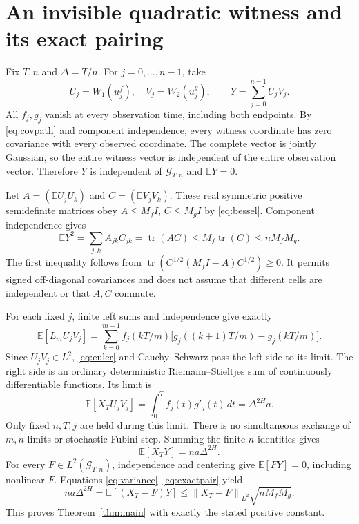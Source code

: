 \documentclass[11pt]{article}
\newcommand{\E}{\mathbb E}
\newcommand{\G}{\mathcal G}
\newcommand{\norm}[1]{\left\lVert#1\right\rVert}
\begin{document}
\section{An invisible quadratic witness and its exact pairing}
Fix $T,n$ and $\Delta=T/n$. For $j=0,\ldots,n-1$, take
\[
U_j=W_1(u_j^f),\quad V_j=W_2(u_j^g),\qquad
Y=\sum_{j=0}^{n-1}U_jV_j.
\]
All $f_j,g_j$ vanish at every observation time, including both endpoints. By \eqref{eq:covpath} and component independence, every witness coordinate has zero covariance with every observed coordinate. The complete vector is jointly Gaussian, so the entire witness vector is independent of the entire observation vector. Therefore $Y$ is independent of $\G_{T,n}$ and $\E Y=0$.

Let $A=(\E U_jU_k)$ and $C=(\E V_jV_k)$. These real symmetric positive semidefinite matrices obey $A\le M_fI$, $C\le M_gI$ by \eqref{eq:bessel}. Component independence gives
\begin{equation}
\E Y^2=\sum_{j,k}A_{jk}C_{jk}=\operatorname{tr}(AC)
\le M_f\operatorname{tr}(C)\le nM_fM_g.\label{eq:variance}
\end{equation}
The first inequality follows from
$\operatorname{tr}(C^{1/2}(M_fI-A)C^{1/2})\ge0$.
It permits signed off-diagonal covariances and does not assume that different cells are independent or that $A,C$ commute.

For each fixed $j$, finite left sums and independence give exactly
\begin{equation}
\E[L_mU_jV_j]=\sum_{k=0}^{m-1}f_j(kT/m)
\bigl[g_j((k+1)T/m)-g_j(kT/m)\bigr].\label{eq:finitepair}
\end{equation}
Since $U_jV_j\in L^2$, \eqref{eq:euler} and Cauchy--Schwarz pass the left side to its limit. The right side is an ordinary deterministic Riemann--Stieltjes sum of continuously differentiable functions. Its limit is
\[
\E[X_TU_jV_j]=\int_0^T f_j(t)g'_j(t)\,dt=\Delta^{2H}a.
\]
Only fixed $n,T,j$ are held during this limit. There is no simultaneous exchange of $m,n$ limits or stochastic Fubini step. Summing the finite $n$ identities gives
\begin{equation}
\E[X_TY]=na\Delta^{2H}.\label{eq:exactpair}
\end{equation}
For every $F\in L^2(\G_{T,n})$, independence and centering give $\E[FY]=0$, including nonlinear $F$. Equations \eqref{eq:variance}--\eqref{eq:exactpair} yield
\[
na\Delta^{2H}=\E[(X_T-F)Y]
\le\norm{X_T-F}_{L^2}\sqrt{nM_fM_g}.
\]
This proves Theorem~\ref{thm:main} with exactly the stated positive constant.
\end{document}
